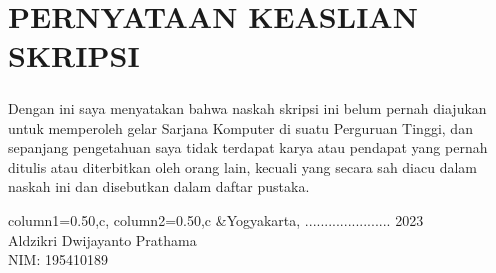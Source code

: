 \documentclass[../SKRIPSI_ALDZIKRI_DWIJAYANTO_PRATHAMA.tex]{subfiles}
\begin{document}
\setcounter{page}{4}
\chapter*{PERNYATAAN KEASLIAN SKRIPSI}
\begin{doublespace}
\paragraph*{}Dengan ini saya menyatakan bahwa naskah skripsi
ini belum pernah diajukan untuk memperoleh gelar Sarjana
Komputer di suatu Perguruan Tinggi, dan sepanjang
pengetahuan saya tidak terdapat karya atau pendapat yang
pernah ditulis atau diterbitkan oleh orang lain, kecuali
yang secara sah diacu dalam naskah ini dan disebutkan dalam
daftar pustaka.\\
\end{doublespace}
\vspace*{1cm}
\begin{tblr}{column{1}={0.50\linewidth,c},
column{2}={0.50\linewidth,c}}
  &{Yogyakarta, ...................... 2023\\
    \vspace*{3cm}
    Aldzikri Dwijayanto Prathama\\
    NIM: 195410189}
\end{tblr}
\end{document}
